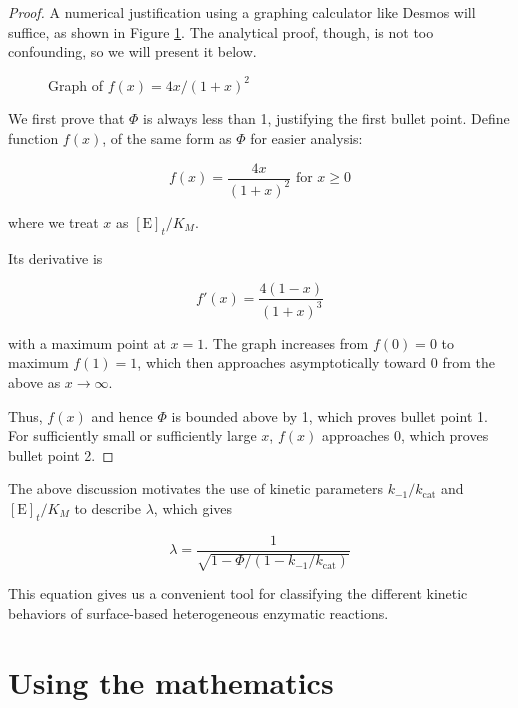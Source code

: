 \documentclass{article}
\newcommand{\Et}{[\text{E}]_t}
\newcommand{\kcat}{k_{\text{cat}}}
\begin{document}
\begin{proof}
    A numerical justification using a graphing calculator like Desmos will suffice, as shown in Figure \ref{fig:func1}. The analytical proof, though, is not too confounding, so we will present it below.

    \begin{figure}[ht]
        \centering
        \caption{Graph of $f(x) = 4x / (1 + x)^2$}
        \label{fig:func1}
    \end{figure}
    
    We first prove that $\Phi$ is always less than 1, justifying the first bullet point. Define function $f(x)$, of the same form as $\Phi$ for easier analysis:

    \[
    f(x) = \frac{4x}{(1 + x)^2} \text{ for } x \geq 0
    \]

    where we treat $x$ as $\Et / K_M$.

    Its derivative is 

    \[
    f'(x) = \frac{4(1 - x)}{(1 + x)^3}
    \]

    with a maximum point at $x = 1$. The graph increases from $f(0) = 0$ to maximum $f(1) = 1$, which then approaches asymptotically toward 0 from the above as $x \to \infty$.

    Thus, $f(x)$ and hence $\Phi$ is bounded above by 1, which proves bullet point 1. For sufficiently small or sufficiently large $x$, $f(x)$ approaches 0, which proves bullet point 2.
\end{proof}

The above discussion motivates the use of kinetic parameters $k_{-1} / \kcat$ and $\Et / K_M$ to describe $\lambda$, which gives

\[
\lambda = \frac{1}{\sqrt{1 - \Phi / (1 - k_{-1} / \kcat)}}
\]

This equation gives us a convenient tool for classifying the different kinetic behaviors of surface-based heterogeneous enzymatic reactions. 

\section{Using the mathematics} \label{section:7}
\end{document}
